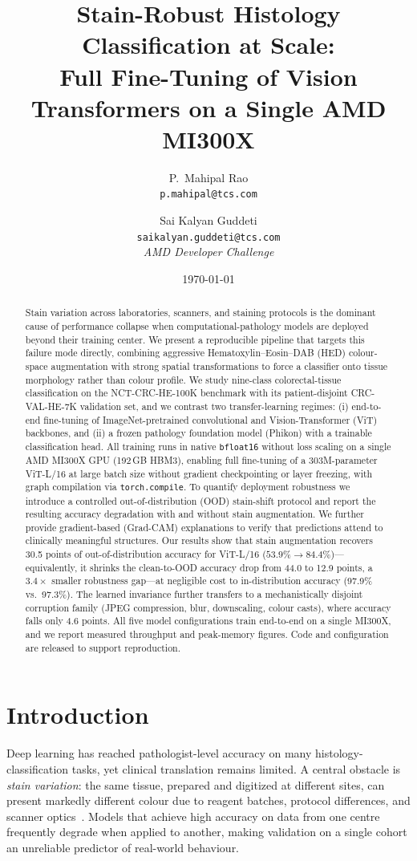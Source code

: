 \documentclass[11pt]{article}
\title{\textbf{Stain-Robust Histology Classification at Scale:\\
Full Fine-Tuning of Vision Transformers on a Single AMD MI300X}}
\author{
P.~Mahipal Rao\\
\texttt{p.mahipal@tcs.com}
\and
Sai Kalyan Guddeti\\
\texttt{saikalyan.guddeti@tcs.com}\\[0.3em]
\textit{AMD Developer Challenge}
}
\date{\today}
\begin{document}
\maketitle

\begin{abstract}
Stain variation across laboratories, scanners, and staining protocols is the dominant
cause of performance collapse when computational-pathology models are deployed beyond their
training center. We present a reproducible pipeline that targets this failure mode directly,
combining aggressive Hematoxylin--Eosin--DAB (HED) colour-space augmentation with strong spatial
transformations to force a classifier onto tissue morphology rather than colour profile. We
study nine-class colorectal-tissue classification on the NCT-CRC-HE-100K benchmark with its
patient-disjoint CRC-VAL-HE-7K validation set, and we contrast two transfer-learning regimes:
(i) end-to-end fine-tuning of ImageNet-pretrained convolutional and Vision-Transformer (ViT)
backbones, and (ii) a frozen pathology foundation model (Phikon) with a trainable classification
head. All training runs in native \texttt{bfloat16} without loss scaling on a single AMD MI300X
GPU (192\,GB HBM3), enabling full fine-tuning of a 303M-parameter ViT-L/16 at large batch size
without gradient checkpointing or layer freezing, with graph compilation via
\texttt{torch.compile}. To quantify deployment robustness we introduce a controlled
out-of-distribution (OOD) stain-shift protocol and report the resulting accuracy degradation
with and without stain augmentation. We further provide gradient-based (Grad-CAM) explanations to
verify that predictions attend to clinically meaningful structures. Our results show that
stain augmentation recovers 30.5 points of out-of-distribution accuracy for ViT-L/16
($53.9\%\rightarrow84.4\%$)---equivalently, it shrinks the clean-to-OOD accuracy drop from
44.0 to 12.9 points, a $3.4\times$ smaller robustness gap---at negligible cost to
in-distribution accuracy (97.9\% vs.\ 97.3\%). The learned invariance further transfers to a
mechanistically disjoint corruption family (JPEG compression, blur, downscaling, colour
casts), where accuracy falls only 4.6 points. All five model configurations train end-to-end
on a single MI300X, and we report measured throughput and peak-memory figures.
Code and configuration are released to support reproduction.
\end{abstract}

\section{Introduction}
Deep learning has reached pathologist-level accuracy on many histology-classification tasks, yet
clinical translation remains limited. A central obstacle is \emph{stain variation}: the same
tissue, prepared and digitized at different sites, can present markedly different colour due to
reagent batches, protocol differences, and scanner optics~\citep{tellez2019quantifying}. Models
that achieve high accuracy on data from one centre frequently degrade when applied to another,
making validation on a single cohort an unreliable predictor of real-world behaviour.
\end{document}
